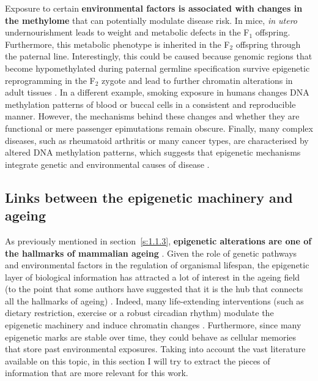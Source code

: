 \bigskip

Exposure to certain \textbf{environmental factors is associated with changes in the methylome} that can potentially modulate disease risk. In mice, \textit{in utero} undernourishment leads to weight and metabolic defects in the F$_1$ offspring. Furthermore, this metabolic phenotype is inherited in the F$_2$ offspring through the paternal line. Interestingly, this could be caused because genomic regions that become hypomethylated during paternal germline specification survive epigenetic reprogramming in the F$_2$ zygote and lead to further chromatin alterations in adult tissues \cite{Radford2014}. In a different example, smoking exposure in humans changes DNA methylation patterns of blood \cite{Roby2016} or buccal cells \cite{Teschendorff2015} in a consistent and reproducible manner. However, the mechanisms behind these changes and whether they are functional or mere passenger epimutations remain obscure. Finally, many complex diseases, such as rheumatoid arthritis or many cancer types, are characterised by altered DNA methylation patterns, which suggests that epigenetic mechanisms integrate genetic and environmental causes of disease \cite{Liu2013,Widschwendter2018}.

\smallskip

\subsection{Links between the epigenetic machinery and ageing} \label{s:1.2.3}

\smallskip

As previously mentioned in section~\ref{s:1.1.3}, \textbf{epigenetic alterations are one of the hallmarks of mammalian ageing} \cite{Lopez-Otin2013}. Given the role of genetic pathways and environmental factors in the regulation of organismal lifespan, the epigenetic layer of biological information has attracted a lot of interest in the ageing field (to the point that some authors have suggested that it is the hub that connects all the hallmarks of ageing) \cite{Booth2016}. Indeed, many life-extending interventions (such as dietary restriction, exercise or a robust circadian rhythm) modulate the epigenetic machinery and induce chromatin changes \cite{Benayoun2015a}. Furthermore, since many epigenetic marks are stable over time, they could behave as cellular memories that store past environmental exposures. Taking into account the vast literature available on this topic, in this section I will try to extract the pieces of information that are more relevant for this work.

